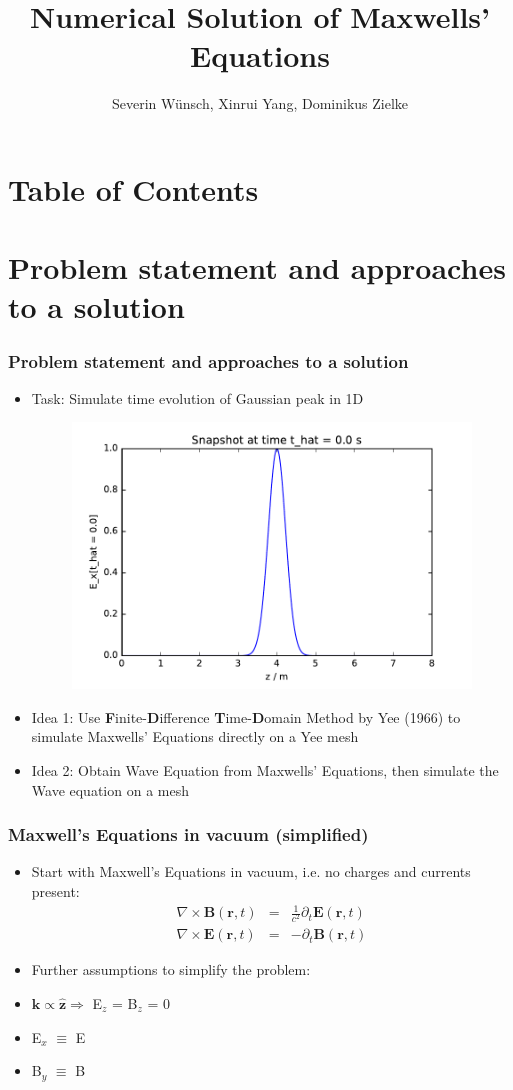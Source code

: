 \documentclass[ignorenonframetext]{beamer}
\title[]{Numerical Solution of Maxwells' Equations}
\subtitle{}
\author[Wünsch, Yang, Zielke]{\large{Severin Wünsch, Xinrui Yang, Dominikus Zielke} \\
}
\institute[Universität Augsburg]{Institut für Physik der Universität Augsburg}
\date[29.07.2016]
\begin{document}
\frame[plain]{\titlepage}

\section*{Table of Contents}
\begin{frame}
\tableofcontents[]
\end{frame}

\section{Problem statement and approaches to a solution}
\begin{frame}
\frametitle{Problem statement and approaches to a solution}
\begin{itemize}
\item Task: Simulate time evolution of Gaussian peak in 1D
\begin{figure}
\centering
\includegraphics[width=0.7\linewidth]{problem_statement}
\label{fig:yee_mesh}
\end{figure}
\item Idea 1: Use \textbf{F}inite-\textbf{D}ifference \textbf{T}ime-\textbf{D}omain Method by Yee (1966) to simulate Maxwells' Equations directly on a Yee mesh
\item Idea 2: Obtain Wave Equation from Maxwells' Equations, then simulate the Wave equation on a mesh
\end{itemize}
\end{frame}

\begin{frame}
\frametitle{Maxwell's Equations in vacuum (simplified)}
\begin{itemize}
\item Start with Maxwell's Equations in vacuum, i.e. no charges and currents present:
\begin{eqnarray}
\nabla \times \boldsymbol{B}(\boldsymbol{r},t) &=& \frac{1}{c^2}\partial_t{\boldsymbol{E}}(\boldsymbol{r},t)\nonumber\\
\nabla \times \boldsymbol{E}(\boldsymbol{r},t) &=& -\partial_t{\boldsymbol{B}}(\boldsymbol{r}, t)
\end{eqnarray}
\item Further assumptions to simplify the problem:
\item $\boldsymbol{k} \propto \hat{\boldsymbol{z}} \Rightarrow $ E$_z$ = B$_z$ = 0   
\item E$_x$ $\equiv$ E 
\item B$_y$ $\equiv$ B
\end{itemize}
\end{frame}
\end{document}
